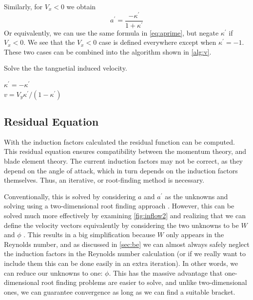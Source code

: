 \documentclass{article}
\begin{document}
Similarly, for $V_x < 0$ we obtain
\begin{equation}
    a^\prime = \frac{-\kappa^\prime}{1 + \kappa^\prime}
\end{equation}
Or equivalently, we can use the same formula in \cref{eq:aprime}, but negate $\kappa^\prime$ if $V_x < 0$.  We see that the $V_x < 0$ case is defined everywhere except when $\kappa^\prime = -1$.  These two cases can be combined into the algorithm shown in \cref{alg:v}.

\begin{algorithm}[htbp]
\caption{Solve the the tangnetial induced velocity.}
\begin{algorithmic}

    \State $\kappa^\prime = -\kappa^\prime$
\EndIf
\\
\State $v = V_y \kappa^\prime/(1 - \kappa^\prime)$
\end{algorithmic}
\label{alg:v}
\end{algorithm}



\subsection{Residual Equation}

With the induction factors calculated the residual function can be computed. This residual equation ensures compatibility between the momentum theory, and blade element theory. The current induction factors may not be correct, as they depend on the angle of attack, which in turn depends on the induction factors themselves.  Thus, an iterative, or root-finding method is necessary.

Conventionally, this is solved by considering $a$ and $a^\prime$ as the unknowns and solving using a two-dimensional root finding approach \cite{Manwell2009,Hansen2008,Burton2011}.  However, this can be solved much more effectively by examining \cref{fig:inflow2} and realizing that we can define the velocity vectors equivalently by considering the two unknowns to be $W$ and $\phi$ \cite{Ning2014b}.  This results in a big simplification because $W$ only appears in the Reynolds number, and as discussed in \cref{sec:be} we can almost always safely neglect the induction factors in the Reynolds number calculation (or if we really want to include them this can be done easily in an extra iteration). In other words, we can reduce our unknowns to one: $\phi$.  This has the massive advantage that one-dimensional root finding problems are easier to solve, and unlike two-dimensional ones, we can guarantee convergence as long as we can find a suitable bracket.
\end{document}
